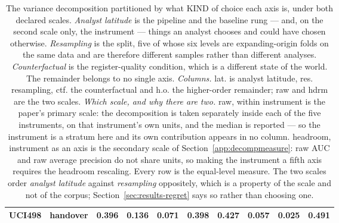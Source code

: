 \begin{table}[t]
{\begin{tabular}{llrrrrrrrr}
UCI498 & handover & 0.396 & 0.136 & 0.071 & 0.398 & 0.427 & 0.057 & 0.025 & 0.491 \\
\bottomrule
\end{tabular}%
}
\caption{The variance decomposition partitioned by what KIND of choice each axis is, under both declared scales. \emph{Analyst latitude} is the pipeline and the baseline rung --- and, on the second scale only, the instrument --- things an analyst chooses and could have chosen otherwise. \emph{Resampling} is the split, five of whose six levels are expanding-origin folds on the same data and are therefore different samples rather than different analyses. \emph{Counterfactual} is the register-quality condition, which is a different state of the world. The remainder belongs to no single axis. \emph{Columns.} \textsf{lat.} is analyst latitude, \textsf{res.} resampling, \textsf{ctf.} the counterfactual and \textsf{h.o.} the higher-order remainder; \textsf{raw} and \textsf{hdrm} are the two scales. \emph{Which scale, and why there are two.} \textsf{raw, within instrument} is the paper's primary scale: the decomposition is taken separately inside each of the five instruments, on that instrument's own units, and the median is reported --- so the instrument is a stratum here and its own contribution appears in no column. \textsf{headroom, instrument as an axis} is the secondary scale of Section~\ref{app:decompmeasure}: raw AUC and raw average precision do not share units, so making the instrument a fifth axis requires the headroom rescaling. Every row is the equal-level measure. The two scales order \emph{analyst latitude} against \emph{resampling} oppositely, which is a property of the scale and not of the corpus; Section~\ref{sec:results-regret} says so rather than choosing one.}
\label{tab:axiskind}
\end{table}
